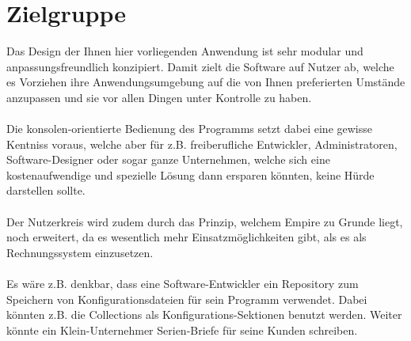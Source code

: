 
\section{Zielgruppe}

Das Design der Ihnen hier vorliegenden Anwendung ist sehr modular und anpassungsfreundlich konzipiert. Damit zielt die Software auf Nutzer ab, welche
es Vorziehen ihre Anwendungsumgebung auf die von Ihnen preferierten Umstände anzupassen und sie vor allen Dingen unter Kontrolle zu haben.
\\\\
Die konsolen-orientierte Bedienung des Programms setzt dabei eine gewisse Kentniss voraus, welche aber für z.B. freiberufliche Entwickler, Administratoren,
Software-Designer oder sogar ganze Unternehmen, welche sich eine kostenaufwendige und spezielle Lösung dann ersparen könnten, keine Hürde darstellen sollte.
\\\\
Der Nutzerkreis wird zudem durch das Prinzip, welchem Empire zu Grunde liegt, noch erweitert, da es wesentlich mehr Einsatzmöglichkeiten gibt, als es als Rechnungssystem
einzusetzen.
\\\\
Es wäre z.B. denkbar, dass eine Software-Entwickler ein Repository zum Speichern von Konfigurationsdateien für sein Programm verwendet.
Dabei könnten z.B. die Collections als Konfigurations-Sektionen benutzt werden. Weiter könnte ein Klein-Unternehmer Serien-Briefe für seine Kunden schreiben.

%
%
